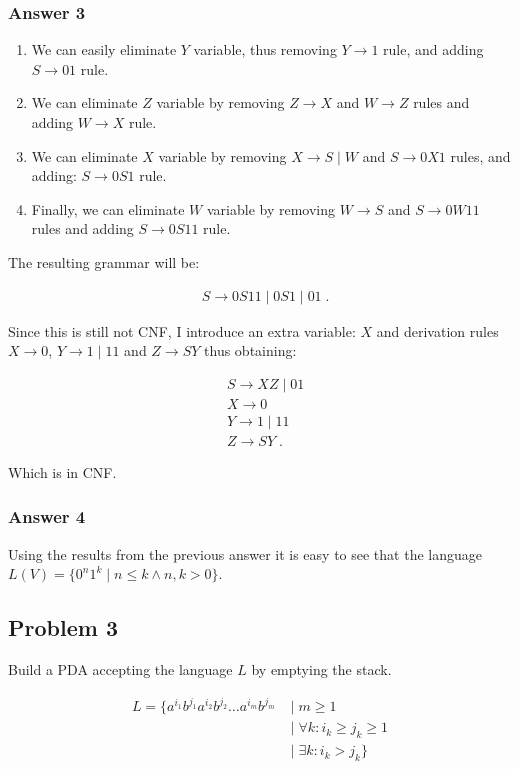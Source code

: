 \documentclass[11pt]{article}
\begin{document}
\subsubsection{Answer 3}
\label{sec-1-2-1}
\begin{enumerate}
\item We can easily eliminate $Y$ variable, thus removing $Y \to 1$ rule,
and adding $S \to 01$ rule.
\item We can eliminate $Z$ variable by removing $Z \to X$ and $W \to Z$ rules
and adding $W \to X$ rule.
\item We can eliminate $X$ variable by removing $X \to S \;|\; W$ and $S \to
       0X1$ rules, and adding: $S \to 0S1$ rule.
\item Finally, we can eliminate $W$ variable by removing $W \to S$ and $S \to
       0W11$ rules and adding $S \to 0S11$ rule.
\end{enumerate}


The resulting grammar will be:

\begin{align*}
  &S \to 0S11 \;|\; 0S1 \;|\; 01 \;.
\end{align*}


Since this is still not CNF, I introduce an extra variable: $X$ and
derivation rules $X \to 0$, $Y \to 1 \;|\; 11$ and $Z \to SY$ thus
obtaining:

\begin{align*}
  &S \to XZ \;|\; 01 \\
  &X \to 0 \\
  &Y \to 1 \;|\; 11 \\
  &Z \to SY \;.
\end{align*}


Which is in CNF.

\subsubsection{Answer 4}
\label{sec-1-2-2}
Using the results from the previous answer it is easy to see that
the language $L(V)=\{0^n1^k \;|\; n \leq k \land n,k > 0\}$.

\subsection{Problem 3}
\label{sec-1-3}
Build a PDA accepting the language $L$ by emptying the stack.

\begin{align*}
  L = \{ a^{i_1}b^{j_1}a^{i_2}b^{j_2}\dots a^{i_m}b^{j_m}
       &\;|\; m \geq 1 \\
       &\;|\; \forall k: i_k \geq j_k \geq 1 \\
       &\;|\; \exists k: i_k > j_k \}
\end{align*}
\end{document}
